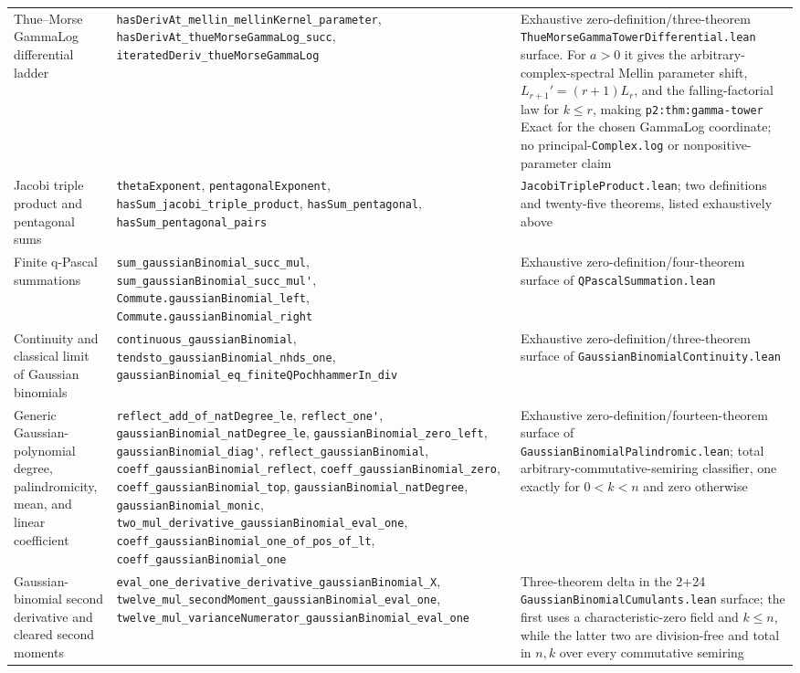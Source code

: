 \documentclass[11pt,oneside]{article}
\theoremstyle{definition}
\theoremstyle{remark}
\begin{document}
\begin{longtable}{@{}>{\raggedright\arraybackslash}p{} >{\raggedright\arraybackslash}p{} >{\raggedright\arraybackslash}p{}@{}}
Thue--Morse GammaLog differential ladder & \nolinkurl{hasDerivAt_mellin_mellinKernel_parameter}, \nolinkurl{hasDerivAt_thueMorseGammaLog_succ}, \nolinkurl{iteratedDeriv_thueMorseGammaLog} & Exhaustive zero-definition/three-theorem \nolinkurl{ThueMorseGammaTowerDifferential.lean} surface.  For \(a>0\) it gives the arbitrary-complex-spectral Mellin parameter shift, \(L_{r+1}'=(r+1)L_r\), and the falling-factorial law for \(k\le r\), making \nolinkurl{p2:thm:gamma-tower} Exact for the chosen GammaLog coordinate; no principal-\nolinkurl{Complex.log} or nonpositive-parameter claim \\
Jacobi triple product and pentagonal sums & \nolinkurl{thetaExponent}, \nolinkurl{pentagonalExponent}, \nolinkurl{hasSum_jacobi_triple_product}, \nolinkurl{hasSum_pentagonal}, \nolinkurl{hasSum_pentagonal_pairs} & \nolinkurl{JacobiTripleProduct.lean}; two definitions and twenty-five theorems, listed exhaustively above \\
Finite q-Pascal summations & \nolinkurl{sum_gaussianBinomial_succ_mul}, \nolinkurl{sum_gaussianBinomial_succ_mul'}, \nolinkurl{Commute.gaussianBinomial_left}, \nolinkurl{Commute.gaussianBinomial_right} & Exhaustive zero-definition/four-theorem surface of \nolinkurl{QPascalSummation.lean} \\
Continuity and classical limit of Gaussian binomials & \nolinkurl{continuous_gaussianBinomial}, \nolinkurl{tendsto_gaussianBinomial_nhds_one}, \nolinkurl{gaussianBinomial_eq_finiteQPochhammerIn_div} & Exhaustive zero-definition/three-theorem surface of \nolinkurl{GaussianBinomialContinuity.lean} \\
Generic Gaussian-polynomial degree, palindromicity, mean, and linear coefficient & \nolinkurl{reflect_add_of_natDegree_le}, \nolinkurl{reflect_one'}, \nolinkurl{gaussianBinomial_natDegree_le}, \nolinkurl{gaussianBinomial_zero_left}, \nolinkurl{gaussianBinomial_diag'}, \nolinkurl{reflect_gaussianBinomial}, \nolinkurl{coeff_gaussianBinomial_reflect}, \nolinkurl{coeff_gaussianBinomial_zero}, \nolinkurl{coeff_gaussianBinomial_top}, \nolinkurl{gaussianBinomial_natDegree}, \nolinkurl{gaussianBinomial_monic}, \nolinkurl{two_mul_derivative_gaussianBinomial_eval_one}, \nolinkurl{coeff_gaussianBinomial_one_of_pos_of_lt}, \nolinkurl{coeff_gaussianBinomial_one} & Exhaustive zero-definition/fourteen-theorem surface of \nolinkurl{GaussianBinomialPalindromic.lean}; total arbitrary-commutative-semiring classifier, one exactly for \(0<k<n\) and zero otherwise \\
Gaussian-binomial second derivative and cleared second moments & \nolinkurl{eval_one_derivative_derivative_gaussianBinomial_X}, \nolinkurl{twelve_mul_secondMoment_gaussianBinomial_eval_one}, \nolinkurl{twelve_mul_varianceNumerator_gaussianBinomial_eval_one} & Three-theorem delta in the 2+24 \nolinkurl{GaussianBinomialCumulants.lean} surface; the first uses a characteristic-zero field and \(k\le n\), while the latter two are division-free and total in \(n,k\) over every commutative semiring \\

\end{longtable}
\end{document}
